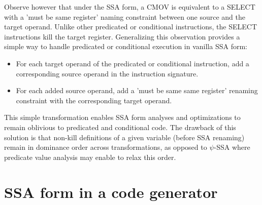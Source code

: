 Observe however that under the SSA form, a CMOV is equivalent to a SELECT with a
'must be same register' naming constraint between one source and the target
operand. Unlike other predicated or conditional instructions, the SELECT
instructions kill the target register.  Generalizing this observation provides a
simple way to handle predicated or conditional execution in vanilla SSA form:
\begin{itemize}

\item For each target operand of the predicated or conditional instruction, add
a corresponding source operand in the instruction signature.

\item For each added source operand, add a 'must be same same register' renaming
constraint with the corresponding target operand.

\end{itemize}
This simple transformation enables SSA form analyses and optimizations to remain
oblivious to predicated and conditional code. The drawback of this solution is
that non-kill definitions of a given variable (before SSA renaming) remain in
dominance order across transformations, as opposed to $\psi$-SSA where predicate
value analysis may enable to relax this order.


\section{SSA form in a code generator}
\label{sec:ssa-codegen-engineering}

%
%
%
%
%
%

%
%

